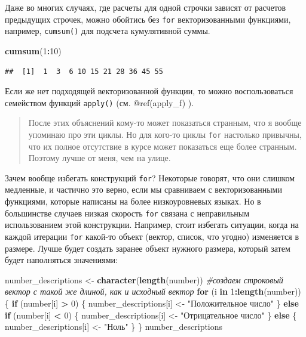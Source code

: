 \documentclass[
]{book}
\newenvironment{Shaded}{\begin{snugshade}}{\end{snugshade}}
\newcommand{\CommentTok}[1]{\textcolor[rgb]{0.56,0.35,0.01}{\textit{#1}}}
\newcommand{\ControlFlowTok}[1]{\textcolor[rgb]{0.13,0.29,0.53}{\textbf{#1}}}
\newcommand{\DecValTok}[1]{\textcolor[rgb]{0.00,0.00,0.81}{#1}}
\newcommand{\KeywordTok}[1]{\textcolor[rgb]{0.13,0.29,0.53}{\textbf{#1}}}
\newcommand{\NormalTok}[1]{#1}
\newcommand{\OperatorTok}[1]{\textcolor[rgb]{0.81,0.36,0.00}{\textbf{#1}}}
\newcommand{\StringTok}[1]{\textcolor[rgb]{0.31,0.60,0.02}{#1}}
\begin{document}
Даже во многих случаях, где расчеты для одной строчки зависят от расчетов предыдущих строчек, можно обойтись без \texttt{for} векторизованными функциями, например, \texttt{cumsum()} для подсчета кумулятивной суммы.

\begin{Shaded}
\begin{Highlighting}[]
\KeywordTok{cumsum}\NormalTok{(}\DecValTok{1}\OperatorTok{:}\DecValTok{10}\NormalTok{)}
\end{Highlighting}
\end{Shaded}

\begin{verbatim}
##  [1]  1  3  6 10 15 21 28 36 45 55
\end{verbatim}

Если же нет подходящей векторизованной функции, то можно воспользоваться семейством функций \texttt{apply()} (см. @ref(apply\_f) ).

\begin{quote}
После этих объяснений кому-то может показаться странным, что я вообще упоминаю про эти циклы. Но для кого-то циклы \texttt{for} настолько привычны, что их полное отсутствие в курсе может показаться еще более странным. Поэтому лучше от меня, чем на улице.
\end{quote}

Зачем вообще избегать конструкций \texttt{for}? Некоторые говорят, что они слишком медленные, и частично это верно, если мы сравниваем с векторизованными функциями, которые написаны на более низкоуровневых языках. Но в большинстве случаев низкая скорость \texttt{for} связана с неправильным использованием этой конструкции. Например, стоит избегать ситуации, когда на каждой итерации \texttt{for} какой-то объект (вектор, список, что угодно) изменяется в размере. Лучше будет создать заранее объект нужного размера, который затем будет наполняться значениями:

\begin{Shaded}
\begin{Highlighting}[]
\NormalTok{number_descriptions <-}\StringTok{ }\KeywordTok{character}\NormalTok{(}\KeywordTok{length}\NormalTok{(number)) }\CommentTok{#создаем строковый вектор с такой же длиной, как и исходный вектор}
\ControlFlowTok{for}\NormalTok{ (i }\ControlFlowTok{in} \DecValTok{1}\OperatorTok{:}\KeywordTok{length}\NormalTok{(number)) \{}
  \ControlFlowTok{if}\NormalTok{ (number[i] }\OperatorTok{>}\StringTok{ }\DecValTok{0}\NormalTok{) \{}
\NormalTok{    number_descriptions[i] <-}\StringTok{ "Положительное число"}
\NormalTok{  \} }\ControlFlowTok{else} \ControlFlowTok{if}\NormalTok{ (number[i] }\OperatorTok{<}\StringTok{ }\DecValTok{0}\NormalTok{) \{}
\NormalTok{    number_descriptions[i] <-}\StringTok{ "Отрицательное число"}
\NormalTok{  \} }\ControlFlowTok{else}\NormalTok{ \{}
\NormalTok{    number_descriptions[i] <-}\StringTok{ "Ноль"}
\NormalTok{  \}}
\NormalTok{\}}
\NormalTok{number_descriptions}
\end{Highlighting}
\end{Shaded}
\end{document}

